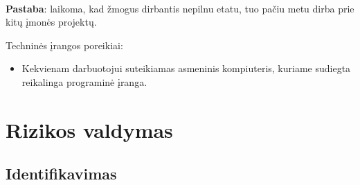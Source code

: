 \documentclass[a4paper,12pt]{article}
\begin{document}
\vspace{1cm}
\\
\textbf{Pastaba}: laikoma, kad žmogus dirbantis nepilnu etatu, tuo pačiu metu dirba prie kitų įmonės projektų.

Techninės įrangos poreikiai:
\begin{itemize}
\item Kekvienam darbuotojui suteikiamas asmeninis kompiuteris, kuriame sudiegta reikalinga programinė įranga.
\end{itemize}

\clearpage

\section{Rizikos valdymas}

\subsection{Identifikavimas}



\FloatBarrier
\end{document}
